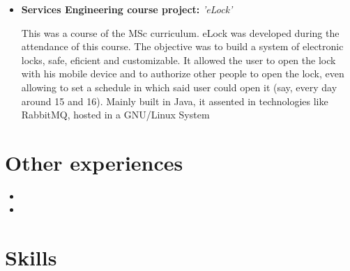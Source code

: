 \documentclass[11pt,a4paper,sans]{moderncv} %
\begin{document}
\begin{itemize}
\item{\textbf{Services Engineering course project: }\textit{'eLock'}

\vspace{3pt}

\small{This was a course of the MSc curriculum. eLock was developed during the
  attendance of this course. The objective was to build a system of electronic
  locks, safe, eficient and customizable. It allowed the user to open the lock
  with his mobile device and to authorize other people to open the lock, even
  allowing to set a schedule in which said user could open it (say, every day
  around 15 and 16). Mainly built in Java, it assented in technologies like
  RabbitMQ, hosted in a GNU/Linux System}}

\end{itemize}

\section{Other experiences}

\vspace{6pt}

\begin{itemize}
\item{}

\vspace{6pt}

\item{}


\end{itemize}

\section{Skills}

\vspace{6pt}
\end{document}
